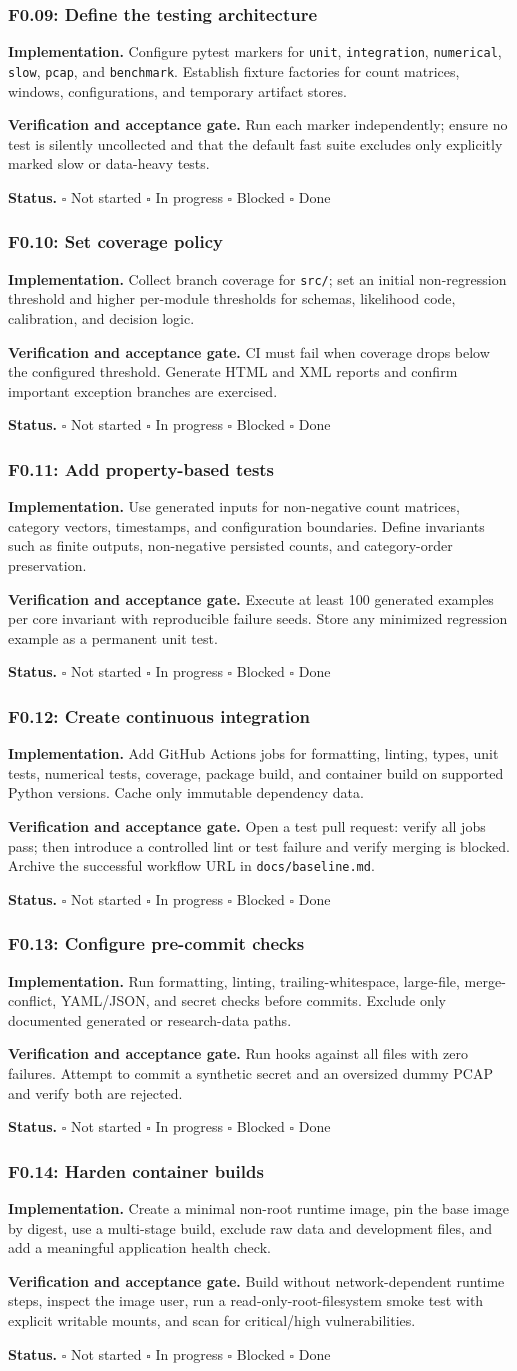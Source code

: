 \documentclass[11pt,a4paper]{article}
\newcommand{\status}{\(\square\) Not started \quad \(\square\) In progress \quad \(\square\) Blocked \quad \(\square\) Done}
\newcommand{\task}[4]{%
  \subsubsection{#1: #2}
  \textbf{Implementation.} #3

  \textbf{Verification and acceptance gate.} #4

  \textbf{Status.} \status
}
\newcommand{\artifact}[1]{\texttt{#1}}
\begin{document}
\task{F0.09}{Define the testing architecture}{Configure pytest markers for \artifact{unit}, \artifact{integration}, \artifact{numerical}, \artifact{slow}, \artifact{pcap}, and \artifact{benchmark}. Establish fixture factories for count matrices, windows, configurations, and temporary artifact stores.}{Run each marker independently; ensure no test is silently uncollected and that the default fast suite excludes only explicitly marked slow or data-heavy tests.}

\task{F0.10}{Set coverage policy}{Collect branch coverage for \artifact{src/}; set an initial non-regression threshold and higher per-module thresholds for schemas, likelihood code, calibration, and decision logic.}{CI must fail when coverage drops below the configured threshold. Generate HTML and XML reports and confirm important exception branches are exercised.}

\task{F0.11}{Add property-based tests}{Use generated inputs for non-negative count matrices, category vectors, timestamps, and configuration boundaries. Define invariants such as finite outputs, non-negative persisted counts, and category-order preservation.}{Execute at least 100 generated examples per core invariant with reproducible failure seeds. Store any minimized regression example as a permanent unit test.}

\task{F0.12}{Create continuous integration}{Add GitHub Actions jobs for formatting, linting, types, unit tests, numerical tests, coverage, package build, and container build on supported Python versions. Cache only immutable dependency data.}{Open a test pull request: verify all jobs pass; then introduce a controlled lint or test failure and verify merging is blocked. Archive the successful workflow URL in \artifact{docs/baseline.md}.}

\task{F0.13}{Configure pre-commit checks}{Run formatting, linting, trailing-whitespace, large-file, merge-conflict, YAML/JSON, and secret checks before commits. Exclude only documented generated or research-data paths.}{Run hooks against all files with zero failures. Attempt to commit a synthetic secret and an oversized dummy PCAP and verify both are rejected.}

\task{F0.14}{Harden container builds}{Create a minimal non-root runtime image, pin the base image by digest, use a multi-stage build, exclude raw data and development files, and add a meaningful application health check.}{Build without network-dependent runtime steps, inspect the image user, run a read-only-root-filesystem smoke test with explicit writable mounts, and scan for critical/high vulnerabilities.}
\end{document}
